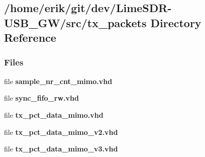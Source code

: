 \subsection{/home/erik/git/dev/\+Lime\+S\+D\+R-\/\+U\+S\+B\+\_\+\+G\+W/src/tx\+\_\+packets Directory Reference}
\label{dir_eb704bd62bbad7f68060370c113ad489}
\subsubsection*{Files}
\begin{DoxyCompactItemize}
\item 
file {\bf sample\+\_\+nr\+\_\+cnt\+\_\+mimo.\+vhd}
\item 
file {\bf sync\+\_\+fifo\+\_\+rw.\+vhd}
\item 
file {\bf tx\+\_\+pct\+\_\+data\+\_\+mimo.\+vhd}
\item 
file {\bf tx\+\_\+pct\+\_\+data\+\_\+mimo\+\_\+v2.\+vhd}
\item 
file {\bf tx\+\_\+pct\+\_\+data\+\_\+mimo\+\_\+v3.\+vhd}
\end{DoxyCompactItemize}
